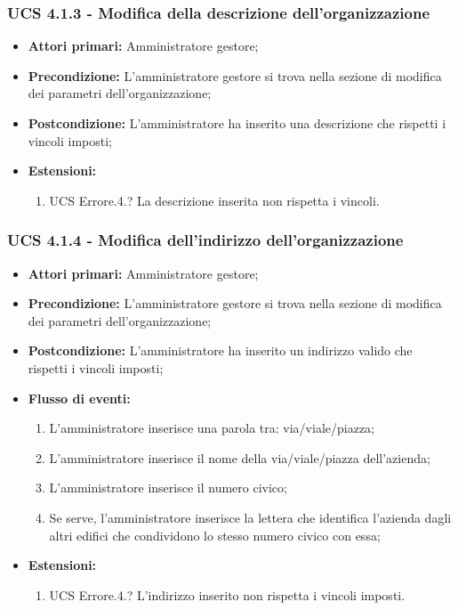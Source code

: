 \subsubsection{UCS 4.1.3 - Modifica della descrizione dell'organizzazione}%
\begin{itemize}
\item \textbf{Attori primari:} Amministratore gestore;
\item \textbf{Precondizione:} L'amministratore gestore si trova nella sezione di modifica dei parametri dell'organizzazione;
\item \textbf{Postcondizione:} L'amministratore ha inserito una descrizione che rispetti i vincoli imposti;
\item \textbf{Estensioni:}
\begin{enumerate}
    \item UCS Errore.4.? La descrizione inserita non rispetta i vincoli.
\end{enumerate}
\end{itemize}

\subsubsection{UCS 4.1.4 - Modifica dell'indirizzo dell'organizzazione}%
\begin{itemize}
\item \textbf{Attori primari:} Amministratore gestore;
\item \textbf{Precondizione:} L'amministratore gestore si trova nella sezione di modifica dei parametri dell'organizzazione;
\item \textbf{Postcondizione:} L'amministratore ha inserito un indirizzo valido che rispetti i vincoli imposti;
\item \textbf{Flusso di eventi:}
\begin{enumerate}
    \item L'amministratore inserisce una parola tra: via/viale/piazza;
    \item L'amministratore inserisce il nome della via/viale/piazza dell'azienda;
    \item L'amministratore inserisce il numero civico;
    \item Se serve, l'amministratore inserisce la lettera che identifica l'azienda dagli altri edifici che condividono lo stesso numero civico con essa;
\end{enumerate}
\item \textbf{Estensioni:}
\begin{enumerate}
    \item UCS Errore.4.? L'indirizzo inserito non rispetta i vincoli imposti.
\end{enumerate}
\end{itemize}